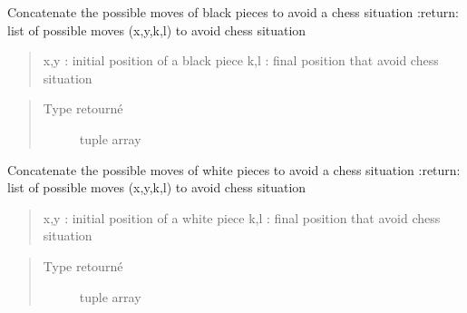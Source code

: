 \documentclass[letterpaper,10pt,french]{sphinxmanual}
\begin{document}
\begin{fulllineitems}
\label{\detokenize{autodoc:echecs.mouv_possible_chess_B}}
Concatenate the possible moves of black pieces to avoid a chess situation
:return: list of possible moves (x,y,k,l) to avoid chess situation
\begin{quote}

x,y : initial position of a black piece
k,l : final position that avoid chess situation
\end{quote}
\begin{quote}\begin{description}
\item[{Type retourné}] \leavevmode
tuple array

\end{description}\end{quote}

\end{fulllineitems}


\begin{fulllineitems}
\label{\detokenize{autodoc:echecs.mouv_possible_chess_W}}
Concatenate the possible moves of white pieces to avoid a chess situation
:return: list of possible moves (x,y,k,l) to avoid chess situation
\begin{quote}

x,y : initial position of a white piece
k,l : final position that avoid chess situation
\end{quote}
\begin{quote}\begin{description}
\item[{Type retourné}] \leavevmode
tuple array

\end{description}\end{quote}

\end{fulllineitems}

\end{document}
